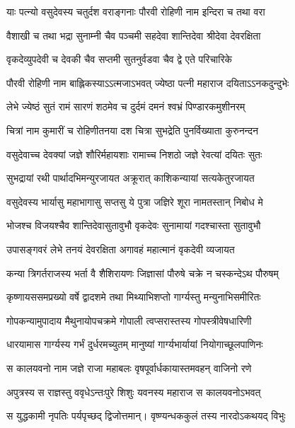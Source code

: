 


\twolineshloka
{याः पत्न्यो वसुदेवस्य चतुर्दश वराङ्गनाः}
{पौरवी रोहिणी नाम इन्दिरा च तथा वरा} %

\twolineshloka
{वैशाखी च तथा भद्रा सुनाम्नी चैव पञ्चमी}
{सहदेवा शान्तिदेवा श्रीदेवा देवरक्षिता} %

\twolineshloka
{वृकदेव्युपदेवी च देवकी चैव सप्तमी}
{सुतनुर्वडवा चैव द्वे एते परिचारिके} %

\twolineshloka
{पौरवी रोहिणी नाम बाह्लिकस्याऽऽत्मजाऽभवत्}
{ज्येष्ठा पत्नी महाराज दयिताऽऽनकदुन्दुभेः} %

\twolineshloka
{लेभे ज्येष्ठं सुतं रामं सारणं शठमेव च}
{दुर्दमं दमनं श्वभ्रं पिण्डारकमुशीनरम्} %

\twolineshloka
{चित्रां नाम कुमारीं च रोहिणीतनया दश}
{चित्रा सुभद्रेति पुनर्विख्याता कुरुनन्दन} %

\twolineshloka
{वसुदेवाच्च देवक्यां जज्ञे शौरिर्महायशाः}
{रामाच्च निशठो जज्ञे रेवत्यां दयितः सुतः} %

\twolineshloka
{सुभद्रायां रथी पार्थादभिमन्युरजायत}
{अक्रूरात् काशिकन्यायां सत्यकेतुरजायत} %

\twolineshloka
{वसुदेवस्य भार्यासु महाभागासु सप्तसु}
{ये पुत्रा जज्ञिरे शूरा नामतस्तान् निबोध मे} %

\twolineshloka
{भोजश्च विजयश्चैव शान्तिदेवासुतावुभौ}
{वृकदेवः सुनामायां गदश्चास्ता सुतावुभौ} %

\twolineshloka
{उपासङ्गवरं लेभे तनयं देवरक्षिता}
{अगावहं महात्मानं वृकदेवी व्यजायत} %

\twolineshloka
{कन्या त्रिगर्तराजस्य भर्ता वै शैशिरायणः}
{जिज्ञासां पौरुषे चक्रे न चस्कन्देऽथ पौरुषम्} %

\twolineshloka
{कृष्णायससमप्रख्यो वर्षे द्वादशमे तथा}
{मिथ्याभिशप्तो गार्ग्यस्तु मन्युनाभिसमीरितः} %

\twolineshloka
{गोपकन्यामुपादाय मैथुनायोपचक्रमे}
{गोपाली त्वप्सरास्तस्य गोपस्त्रीवेषधारिणी} %

\twolineshloka
{धारयामास गार्ग्यस्य गर्भं दुर्धरमच्युतम्}
{मानुष्यां गार्ग्यभार्यायां नियोगाच्छूलपाणिनः} %

\twolineshloka
{स कालयवनो नाम जज्ञे राजा महाबलः}
{वृषपूर्वार्धकायास्तमवहन् वाजिनो रणे} %

\twolineshloka
{अपुत्रस्य स राज्ञस्तु ववृधेऽन्तःपुरे शिशुः}
{यवनस्य महाराज स कालयवनोऽभवत्} %

\twolineshloka
{स युद्धकामी नृपतिः पर्यपृच्छद् द्विजोत्तमान्।}
{वृष्ण्यन्धककुलं तस्य नारदोऽकथयद् विभुः} %

